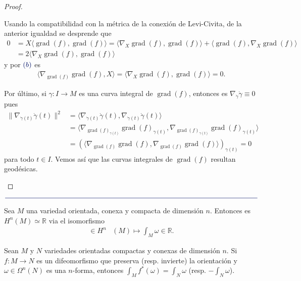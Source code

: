 \documentclass[11pt]{article}
\newcommand{\R}{\mathbb{R}}
\newcommand{\grad}{\operatorname{grad}}
\newcommand{\ip}[1]{\langle #1 \rangle}
\newcommand{\paint}[1]{\color{color}{#1}}
\newcommand{\paintline}{\begin{center}
$\paint{
\rule{400pt}{0.5pt}
}$
\vspace{10pt}
\end{center}}
\newenvironment{theorem}[2][Teorema]{\begin{trivlist}
\item[\hskip \labelsep \paint{{\bfseries #1}}\hskip \labelsep {\bfseries #2.}]}{\end{trivlist}}
\begin{document}
\begin{proof}
\begin{itemize}[listparindent = \parindent]
Usando la compatibilidad con la métrica de la conexión de Levi-Civita, de la anterior igualdad se desprende que 
\begin{align*}
0 &= X \ip{\grad(f),\grad(f)} = \ip{\nabla_X\grad(f),\grad(f)} + \ip{\grad(f),\nabla_X\grad(f)}\\
&= 2\ip{\nabla_X\grad(f),\grad(f)}
\end{align*}
y por $\paint{(b)}$ es
\begin{align*}
\ip{\nabla_{\grad(f)}\grad(f),X} = \ip{\nabla_X\grad(f),\grad(f)} = 0.
\end{align*}

Por último, si $\gamma : I \to M$ es una curva integral de $\grad(f)$, entonces es $\nabla_{\dot{\gamma}}\dot{\gamma} \equiv 0$  pues
\begin{align*}
\|\nabla_{\dot{\gamma}(t)}\dot{\gamma}(t)\|^2 &= \ip{\nabla_{\dot{\gamma}(t)}\dot{\gamma}(t),\nabla_{\dot{\gamma}(t)}\dot{\gamma}(t)}\\
& = \ip{\nabla_{\grad(f)_{\gamma(t)}}\grad(f)_{\gamma(t)},\nabla_{\grad(f)_{\gamma(t)}}\grad(f)_{\gamma(t)}}\\
& = (\ip{\nabla_{\grad(f)}\grad(f),\nabla_{\grad(f)}\grad(f)})_{\gamma(t)} = 0
\end{align*}
para todo $t \in I$. Vemos así que las curvas integrales de $\grad(f)$ resultan geodésicas.
\end{itemize}
\end{proof}

\paintline

\begin{theorem}{1} Sea $M$ una variedad orientada, conexa y compacta de dimensión $n$. Entonces es $H^n(M) \simeq \R$ via el isomorfismo
\begin{align*}
[\omega] \in H^n&(M) \longmapsto \int_M \omega \in \R.
\end{align*}
\end{theorem}

\begin{theorem}{2} Sean $M$ y $N$ variedades orientadas compactas y conexas de dimensión $n$. Si $f : M \to N$ es un difeomorfismo que preserva (resp. invierte) la orientación y $\omega \in \Omega^n(N)$ es una $n$-forma, entonces $\int_M f^*(\omega) = \int_N \omega$ (resp. $-\int_N \omega$). 
\end{theorem}
\end{document}
